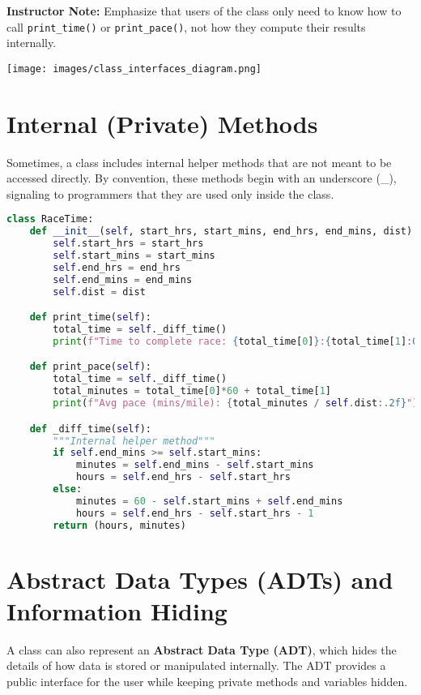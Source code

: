\vspace{1em}
\noindent
\textbf{Instructor Note:} Emphasize that users of the class only need to know how to call \texttt{print\_time()} or \texttt{print\_pace()}, not how they compute their results internally.

\begin{center}
\texttt{[image: images/class\_interfaces\_diagram.png]}
\end{center}

\section{Internal (Private) Methods}
Sometimes, a class includes internal helper methods that are not meant to be accessed directly.  
By convention, these methods begin with an underscore (\_), signaling to programmers that they are used only inside the class.

\begin{lstlisting}[language=Python, caption={RaceTime class with internal helper method.}]
class RaceTime:
    def __init__(self, start_hrs, start_mins, end_hrs, end_mins, dist):
        self.start_hrs = start_hrs
        self.start_mins = start_mins
        self.end_hrs = end_hrs
        self.end_mins = end_mins
        self.dist = dist

    def print_time(self):
        total_time = self._diff_time()
        print(f"Time to complete race: {total_time[0]}:{total_time[1]:02}")

    def print_pace(self):
        total_time = self._diff_time()
        total_minutes = total_time[0]*60 + total_time[1]
        print(f"Avg pace (mins/mile): {total_minutes / self.dist:.2f}")

    def _diff_time(self):
        """Internal helper method"""
        if self.end_mins >= self.start_mins:
            minutes = self.end_mins - self.start_mins
            hours = self.end_hrs - self.start_hrs
        else:
            minutes = 60 - self.start_mins + self.end_mins
            hours = self.end_hrs - self.start_hrs - 1
        return (hours, minutes)
\end{lstlisting}

\section{Abstract Data Types (ADTs) and Information Hiding}
A class can also represent an \textbf{Abstract Data Type (ADT)}, which hides the details of how data is stored or manipulated internally.  
The ADT provides a public interface for the user while keeping private methods and variables hidden.

